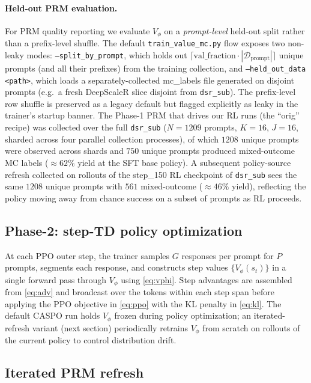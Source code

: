 \documentclass[11pt]{article}
\newcommand{\caspo}{\textsc{CASPO}}
\begin{document}
\paragraph{Held-out PRM evaluation.}
For PRM quality reporting we evaluate $V_\phi$ on a \emph{prompt-level}
held-out split rather than a prefix-level shuffle. The default
\texttt{train\_value\_mc.py} flow exposes two non-leaky modes:
\texttt{--split\_by\_prompt}, which holds out
$\lceil \mathrm{val\_fraction} \cdot |\mathcal{D}_{\mathrm{prompt}}|\rceil$
unique prompts (and all their prefixes) from the training collection,
and \texttt{--held\_out\_data <path>}, which loads a separately-collected
mc\_labels file generated on disjoint prompts (e.g.\ a fresh DeepScaleR
slice disjoint from \texttt{dsr\_sub}). The prefix-level row shuffle is
preserved as a legacy default but flagged explicitly as leaky in the
trainer's startup banner. The Phase-1 PRM that drives our RL runs (the
``orig'' recipe) was collected over the full \texttt{dsr\_sub}
($N{=}1209$ prompts, $K{=}16$, $J{=}16$, sharded across four parallel
collection processes), of which $1208$ unique prompts were observed
across shards and $750$ unique prompts produced mixed-outcome MC labels
(${\approx}62\%$ yield at the SFT base policy). A subsequent
policy-source refresh collected on rollouts of the step\_150 RL
checkpoint of \texttt{dsr\_sub} sees the same $1208$ unique prompts
with $561$ mixed-outcome (${\approx}46\%$ yield), reflecting the
policy moving away from chance success on a subset of prompts as RL
proceeds.

\subsection{Phase-2: step-TD policy optimization}
At each PPO outer step, the trainer samples $G$ responses per prompt
for $P$ prompts, segments each response, and constructs step values
$\{V_\phi(s_t)\}$ in a single forward pass through $V_\phi$ using
\eqref{eq:vphi}. Step advantages are assembled from \eqref{eq:adv} and
broadcast over the tokens within each step span before applying the
PPO objective in \eqref{eq:ppo} with the KL penalty in \eqref{eq:kl}.
The default \caspo{} run holds $V_\phi$ frozen during policy
optimization; an iterated-refresh variant (next section) periodically
retrains $V_\phi$ from scratch on rollouts of the current policy to
control distribution drift.

\subsection{Iterated PRM refresh}
\label{sec:refresh}
\end{document}
